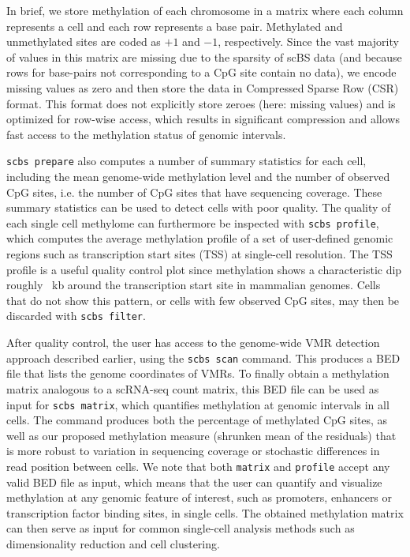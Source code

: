 \documentclass[twocolumn,10pt]{article}
\begin{document}
In brief, we store methylation of each chromosome in a matrix where each column represents a cell and each row represents a base pair.
Methylated and unmethylated sites are coded as $+1$ and $-1$, respectively.
Since the vast majority of values in this matrix are missing due to the sparsity of scBS data (and because rows for base-pairs not corresponding to a CpG site contain no data), we encode missing values as zero and then store the data in Compressed Sparse Row (CSR) format.
This format does not explicitly store zeroes (here: missing values) and is optimized for row-wise access, which results in significant compression and allows fast access to the methylation status of genomic intervals.

\texttt{scbs prepare} also computes a number of summary statistics for each cell, including the mean genome-wide methylation level and the number of observed CpG sites, i.e.
the number of CpG sites that have sequencing coverage.
These summary statistics can be used to detect cells with poor quality.
The quality of each single cell methylome can furthermore be inspected with \texttt{scbs profile}, which computes the average methylation profile of a set of user-defined genomic regions such as transcription start sites (TSS) at single-cell resolution.
The TSS profile is a useful quality control plot since methylation shows a characteristic dip roughly ~kb around the transcription start site in mammalian genomes.
Cells that do not show this pattern, or cells with few observed CpG sites, may then be discarded with \texttt{scbs filter}.


After quality control, the user has access to the genome-wide VMR detection approach described earlier, using the \texttt{scbs scan} command.
This produces a BED file that lists the genome coordinates of VMRs.
To finally obtain a methylation matrix analogous to a scRNA-seq count matrix, this BED file can be used as input for \texttt{scbs matrix}, which quantifies methylation at genomic intervals in all cells.
The command produces both the percentage of methylated CpG sites, as well as our proposed methylation measure (shrunken mean of the residuals) that is more robust to variation in sequencing coverage or stochastic differences in read position between cells.
We note that both \texttt{matrix} and \texttt{profile} accept any valid BED file as input, which means that the user can quantify and visualize methylation at any genomic feature of interest, such as promoters, enhancers or transcription factor binding sites, in single cells.
The obtained methylation matrix can then serve as input for common single-cell analysis methods such as dimensionality reduction and cell clustering.
\end{document}
